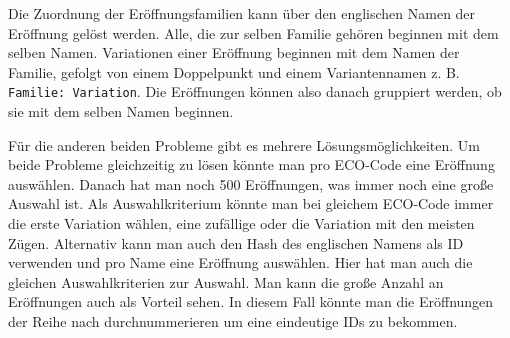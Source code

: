 Die Zuordnung der Eröffnungsfamilien kann über den englischen Namen der Eröffnung gelöst werden. Alle, die zur selben Familie gehören beginnen mit dem selben Namen. Variationen einer Eröffnung beginnen mit dem Namen der Familie, gefolgt von einem Doppelpunkt und einem Variantennamen z. B. \lstinline{Familie: Variation}. Die Eröffnungen können also danach gruppiert werden, ob sie mit dem selben Namen beginnen.

Für die anderen beiden Probleme gibt es mehrere Lösungsmöglichkeiten. Um beide Probleme gleichzeitig zu lösen könnte man pro ECO-Code eine Eröffnung auswählen. Danach hat man noch 500 Eröffnungen, was immer noch eine große Auswahl ist. Als Auswahlkriterium könnte man bei gleichem ECO-Code immer die erste Variation wählen, eine zufällige oder die Variation mit den meisten Zügen. Alternativ kann man auch den Hash des englischen Namens als ID verwenden und pro Name eine Eröffnung auswählen. Hier hat man auch die gleichen Auswahlkriterien zur Auswahl. Man kann die große Anzahl an Eröffnungen auch als Vorteil sehen. In diesem Fall könnte man die Eröffnungen der Reihe nach durchnummerieren um eine eindeutige IDs zu bekommen.


